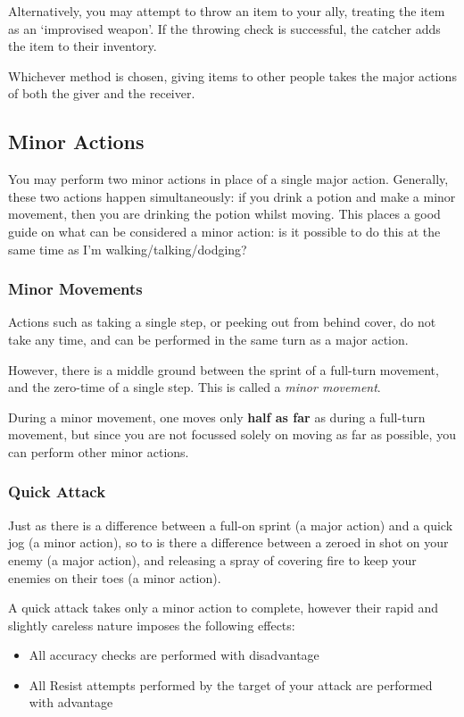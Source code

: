 Alternatively, you may attempt to throw an item to your ally, treating the item as an `improvised weapon'. If the throwing check is successful, the catcher adds the item to their inventory. 

Whichever method is chosen, giving items to other people takes the major actions of both the giver and the receiver. 


\subsection{Minor Actions}
You may perform two minor actions in place of a single major action. Generally, these two actions happen simultaneously: if you drink a potion and make a minor movement, then you are drinking the potion whilst moving. This places a good guide on what can be considered a minor action: is it possible to do this at the same time as I'm walking/talking/dodging? 

\subsubsection{Minor Movements}

Actions such as taking a single step, or peeking out from behind cover, do not take any time, and can be performed in the same turn as a major action. 

However, there is a middle ground between the sprint of a full-turn movement, and the zero-time of a single step. This is called a {\it minor movement}. 

During a minor movement, one moves only {\bf half as far} as during a full-turn movement, but since you are not focussed solely on moving as far as possible, you can perform other minor actions. 

\subsubsection{Quick Attack}

Just as there is a difference between a full-on sprint (a major action) and a quick jog (a minor action), so to is there a difference between a zeroed in shot on your enemy (a major action), and releasing a spray of covering fire to keep your enemies on their toes (a minor action). 

A quick attack takes only a minor action to complete, however their rapid and slightly careless nature imposes the following effects:
\begin{itemize}
	\item All accuracy checks are performed with disadvantage
	\item All Resist attempts performed by the target of your attack are performed with advantage
\end{itemize}

